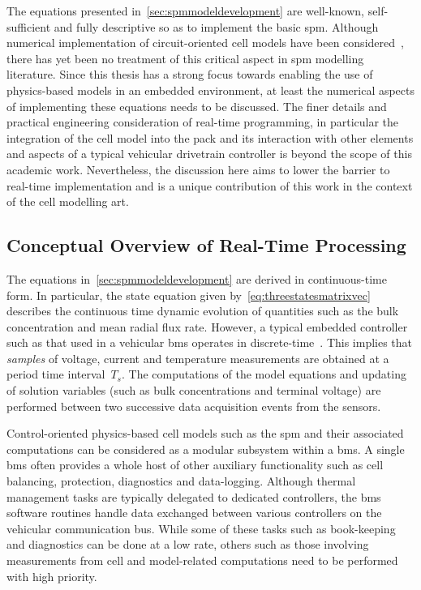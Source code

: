 
The  equations   presented  in~\cref{sec:spmmodeldevelopment}   are  well-known,
self-sufficient and  fully descriptive so  as to implement the  basic \gls{spm}.
Although  numerical implementation  of  circuit-oriented cell  models have  been
considered~\cite{Plett2004,Plett2004a,Plett2004b,Plett2006}, there  has yet been
no treatment  of this critical  aspect in \gls{spm} modelling  literature. Since
this thesis has a strong focus  towards enabling the use of physics-based models
in an embedded environment, at least the numerical aspects of implementing these
equations needs  to be  discussed. The finer  details and  practical engineering
consideration of  real-time programming,  in particular  the integration  of the
cell model into the pack and its  interaction with other elements and aspects of
a typical vehicular  drivetrain controller is beyond the scope  of this academic
work. Nevertheless, the  discussion here aims to lower the  barrier to real-time
implementation and is a  unique contribution of this work in  the context of the
cell modelling art.

\subsection{Conceptual Overview of Real-Time Processing}

The equations  in~\cref{sec:spmmodeldevelopment} are derived  in continuous-time
form. In particular, the  state equation given by~\cref{eq:threestatesmatrixvec}
describes  the  continuous   time  dynamic  evolution  of   quantities  such  as
the  bulk  concentration   and  mean  radial  flux  rate.   However,  a  typical
embedded  controller  such  as  that  used in  a  vehicular  \gls{bms}  operates
in   discrete-time~\cite{Andrea2010}.  This   implies  that   \emph{samples}  of
voltage,  current and  temperature measurements  are obtained  at a  period time
interval~$T_s$. The computations of the model equations and updating of solution
variables  (such as  bulk  concentrations and  terminal  voltage) are  performed
between two successive data acquisition events from the sensors.


Control-oriented  physics-based cell  models  such as  the  \gls{spm} and  their
associated  computations can  be  considered  as a  modular  subsystem within  a
\gls{bms}. A  single \gls{bms} often  provides a  whole host of  other auxiliary
functionality such as cell  balancing, protection, diagnostics and data-logging.
Although  thermal   management  tasks  are  typically   delegated  to  dedicated
controllers,  the  \gls{bms} software  routines  handle  data exchanged  between
various  controllers on  the vehicular  communication bus.  While some  of these
tasks such  as book-keeping and  diagnostics can be done  at a low  rate, others
such as  those involving measurements  from cell and  model-related computations
need to be performed with high priority.


